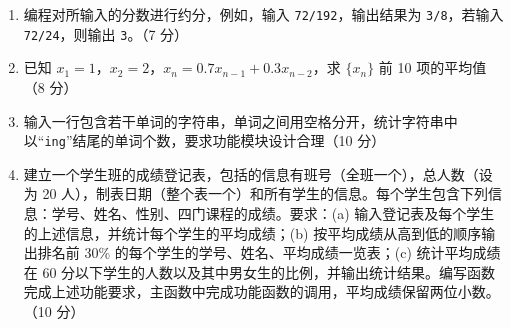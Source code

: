 \documentclass[a4paper,11pt]{ctexart}
\begin{document}
\begin{enumerate}[label=(\arabic*), leftmargin=2.2em, itemsep=5pt]
  \item 编程对所输入的分数进行约分，例如，输入 \texttt{72/192}，输出结果为 \texttt{3/8}，若输入 \texttt{72/24}，则输出 \texttt{3}。（7 分）
  \item 已知 $x_1=1$，$x_2=2$，$x_n=0.7x_{n-1}+0.3x_{n-2}$，求 $\{x_n\}$ 前 10 项的平均值（8 分）
  \item 输入一行包含若干单词的字符串，单词之间用空格分开，统计字符串中以“\texttt{ing}”结尾的单词个数，要求功能模块设计合理（10 分）
  \item 建立一个学生班的成绩登记表，包括的信息有班号（全班一个），总人数（设为 20 人），制表日期（整个表一个）和所有学生的信息。每个学生包含下列信息：学号、姓名、性别、四门课程的成绩。要求：(a) 输入登记表及每个学生的上述信息，并统计每个学生的平均成绩；(b) 按平均成绩从高到低的顺序输出排名前 30\% 的每个学生的学号、姓名、平均成绩一览表；(c) 统计平均成绩在 60 分以下学生的人数以及其中男女生的比例，并输出统计结果。编写函数完成上述功能要求，主函数中完成功能函数的调用，平均成绩保留两位小数。（10 分）
\end{enumerate}
\end{document}
